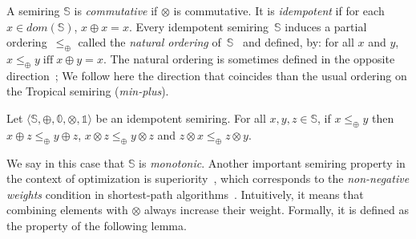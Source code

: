 \documentclass[runningheads]{llncs}
\def\wrt{\textit{wrt}\xspace}
\def\<#1>{\langle #1 \rangle}
\newcommand{\Semiring}{\mathbb{S}}
\newcommand{\zero}{\mathbb{0}}
\newcommand{\one}{\mathbb{1}}
\newcommand{\dom}{\ensuremath{\mathit{dom}}}
\begin{document}
\medskip%
A semiring $\Semiring$ is \emph{commutative} if $\otimes$ is commutative.
It is \emph{idempotent} if for each $x \in \dom(\Semiring)$, $x \oplus x = x$.
%
Every idempotent semiring~$\Semiring$ induces 
a partial ordering~$\leq_\oplus$ 
called the \emph{natural ordering} of~$\Semiring$~\cite{Mohri02semiring} 
and defined,  by: 
for all $x$ and $y$,
$x \leq_\oplus y \;\mbox{iff}\; x \oplus y = x$.
%
The natural ordering is sometimes defined in the opposite direction~\cite{DrosteKuich09semirings};
We follow here the direction  %
that coincides than the usual ordering on the Tropical semiring (\emph{min-plus}).

\begin{lemma}
Let $\< \Semiring, \oplus, \zero, \otimes, \one>$ be an idempotent semiring.
For all $x, y, z  \in \Semiring$,  
if $x \leq_\oplus y$ then
$x \oplus z \leq_\oplus y \oplus z$,
$x \otimes z \leq_\oplus y \otimes z$
and $z \otimes x \leq_\oplus z \otimes y$.
\end{lemma}      
We say in this case that $\Semiring$ is \emph{monotonic}. %
%
Another important semiring property in the context of optimization
is {superiority}~\cite{Huang08advanceddynamic}, 
which corresponds to the 
\emph{non-negative weights} condition in shortest-path algorithms~\cite{Dijkstra59anote}.
Intuitively, it means that combining elements with $\otimes$ always increase their weight. 
Formally, it is defined as the property of the following lemma.
\end{document}

